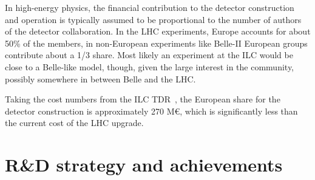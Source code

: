 \documentclass[%
 reprint,
 amsmath,amssymb,
 aps,
]{revtex4-1}
\begin{document}
In high-energy physics, the financial contribution to the detector
construction and operation
is typically assumed to be proportional to the number of authors of
the detector collaboration. In the LHC experiments, Europe accounts for about 50\% of the members, in non-European experiments like Belle-II European groups contribute about a 1/3 share. Most likely an experiment at the ILC would be close to a Belle-like model, though, given the large interest in the community, possibly somewhere in between Belle and the LHC. 

Taking
the cost numbers from
the ILC TDR~\cite{ILC-TDR}, the European share for the detector
construction is approximately 270 M\euro{}, which is significantly less than the current cost of the LHC upgrade.

\section{\label{sec:RandD}R\&D strategy and achievements}
\end{document}
